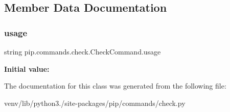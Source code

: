 \subsection{Member Data Documentation}
\mbox{\label{classpip_1_1commands_1_1check_1_1_check_command_ae9099247db7b24303134f64de879394b}} 
\subsubsection{\texorpdfstring{usage}{usage}}
{\footnotesize\ttfamily string pip.\+commands.\+check.\+Check\+Command.\+usage\hspace{0.3cm}{\ttfamily [static]}}

{\bfseries Initial value\+:}
\begin{DoxyCode}
=  \textcolor{stringliteral}{"""}
\textcolor{stringliteral}{  %
\end{DoxyCode}


The documentation for this class was generated from the following file\+:\begin{DoxyCompactItemize}
\item 
venv/lib/python3./site-\/packages/pip/commands/check.\+py\end{DoxyCompactItemize}
